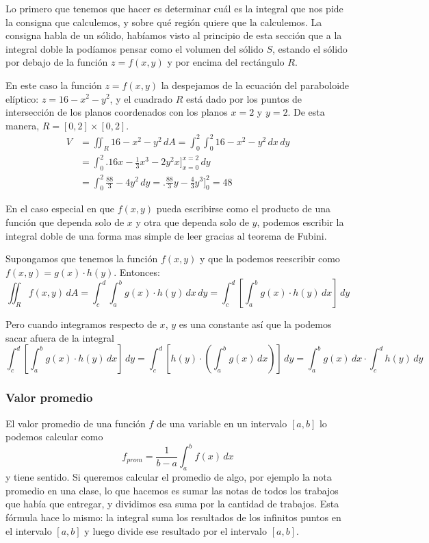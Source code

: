 \documentclass[12pt]{article}
\begin{document}
Lo primero que tenemos que hacer es determinar cuál es la integral que nos pide la consigna que calculemos, y sobre qué región quiere que la calculemos. La consigna habla de un sólido, habíamos visto al principio de esta sección que a la integral doble la podíamos pensar como el volumen del sólido $ S $, estando el sólido por debajo de la función $ z = f(x,y) $ y por encima del rectángulo $ R $.

En este caso la función $ z=f(x,y) $ la despejamos de la ecuación del paraboloide elíptico: $ z = 16-x^2-y^2 $, y el cuadrado $ R $ está dado por los puntos de intersección de los planos coordenados con los planos $ x=2 $ y $ y=2 $. De esta manera, $ R=\left[0,2\right]\times \left[0,2\right] $.
\begin{align*}
  V &= \iint_{R} 16-x^2-y^2 \,dA = \int_{0}^{2} \int_{0}^{2} 16-x^2-y^2 \,dx\,dy\\
   &= \int_{0}^{2} \Bigg.16x-\frac{1}{3}x^3-2y^2x\Bigg]_{x=0}^{x=2} \,dy\\
   &= \int_{0}^{2} \frac{88}{3}-4y^2 \,dy = \Bigg.\frac{88}{3}y-\frac{4}{3}y^3\Bigg]_{0}^{2}=48
\end{align*}

En el caso especial en que $ f(x,y) $ pueda escribirse como el producto de una función que dependa solo de $ x $ y otra que dependa solo de $ y $, podemos escribir la integral doble de una forma mas simple de leer gracias al teorema de Fubini.

Supongamos que tenemos la función $ f(x,y) $ y que la podemos reescribir como $ f(x,y)=g(x)\cdot h(y) $. Entonces:
\[
  \iint_{R} f(x,y) \,dA = \int_{c}^{d} \int_{a}^{b} g(x)\cdot h(y) \,dx\,dy = \int_{c}^{d} \left[\int_{a}^{b} g(x)\cdot h(y) \,dx\right] \,dy
\]

Pero cuando integramos respecto de $ x $, $ y $ es una constante así que la podemos sacar afuera de la integral
\[
  \int_{c}^{d} \left[\int_{a}^{b} g(x)\cdot h(y) \,dx\right] \,dy = \int_{c}^{d} \left[h(y)\cdot \left(\int_{a}^{b} g(x) \,dx\right)\right] \,dy = \int_{a}^{b} g(x) \,dx\cdot \int_{c}^{d} h(y) \,dy
\]

\subsubsection{Valor promedio}
El valor promedio de una función $ f $ de una variable en un intervalo $ \left[a,b\right] $ lo podemos calcular como
\[
  f_{prom}=\frac{1}{b-a}\int_{a}^{b} f(x) \,dx
\]
y tiene sentido. Si queremos calcular el promedio de algo, por ejemplo la nota promedio en una clase, lo que hacemos es sumar las notas de todos los trabajos que había que entregar, y dividimos esa suma por la cantidad de trabajos. Esta fórmula hace lo mismo: la integral suma los resultados de los infinitos puntos en el intervalo $ \left[a,b\right] $ y luego divide ese resultado por el intervalo $ \left[a,b\right] $.
\end{document}

